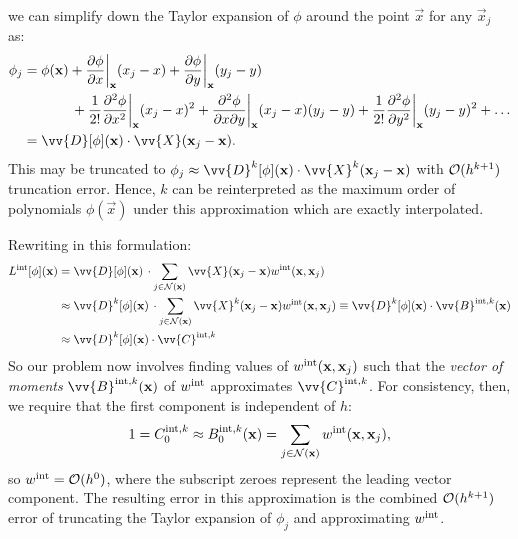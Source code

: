 we can simplify down the Taylor expansion of $\phi$ around the point $\vec{x}$ for any $\vec{x}_j$ as:
\begin{subequations}
\begin{align}
\phi_j &= \phi(\vec{x}) + \pdv{\phi}{x}\bigg|_{\vec{x}} (x_j - x) + \pdv{\phi}{y} \bigg|_{\vec{x}} (y_j - y)  \\
& \qquad  \quad \ \, + \frac{1}{2!} \pdv[2]{\phi}{x}\bigg|_{\vec{x}} (x_j - x)^2 + \pdv[2]{\phi}{x}{y}\bigg|_{\vec{x}} (x_j - x) (y_j - y) + \frac{1}{2!} \pdv[2]{\phi}{y}\bigg|_{\vec{x}} (y_j - y)^2 + \dots \\
&= \vv{D}[\phi](\vec{x}) \cdot \vv{X} (\vec{x}_j - \vec{x}).
\end{align}
\end{subequations}
This may be truncated to $\phi_j \approx \vv{D}^k[\phi](\vec{x}) \cdot \vv{X}^k (\vec{x}_j - \vec{x})$ with $\cl{O}(h^{k + 1})$ truncation error. Hence, $k$ can be reinterpreted as the maximum order of polynomials $\phi(\vec{x})$ under this approximation which are exactly interpolated.

Rewriting  in this formulation:
\begin{subequations}
\begin{align}
L^{\rm{int}}[\phi](\vec{x}) &= \vv{D}[\phi](\vec{x}) \, \cdot \sum_{j \in \cl{N}(\vec{x})} \vv{X} (\vec{x}_j - \vec{x}) w^{\rm{int}}(\vec{x}, \vec{x}_j) \\
&\approx \vv{D}^k[\phi](\vec{x}) \, \cdot \sum_{j \in \cl{N}(\vec{x})} \vv{X}^k (\vec{x}_j - \vec{x}) w^{\rm{int}}(\vec{x}, \vec{x}_j) \equiv \vv{D}^k[\phi](\vec{x}) \cdot \vv{B}^{\rm{int}, k}(\vec{x}) \\
&\approx \vv{D}^k[\phi](\vec{x}) \cdot \vv{C}^{\rm{int}, k}
\end{align}
\end{subequations}
So our problem now involves finding values of $w^{\rm{int}}(\vec{x}, \vec{x}_j)$ such that the \emph{vector of moments} $\vv{B}^{\rm{int}, k}(\vec{x})$ of $w^{\rm{int}}$ approximates $\vv{C}^{\rm{int}, k}$. For consistency, then, we require that the first component is independent of $h$:
\begin{equation}
1 = C^{\rm{int}, k}_0 \approx B^{\rm{int}, k}_0(\vec{x}) = \sum_{j \in \cl{N}(\vec{x})} w^{\rm{int}} (\vec{x}, \vec{x}_j),
\end{equation}
so $w^{\rm{int}} = \cl{O}(h^0)$, where the subscript zeroes represent the leading vector component. The resulting error in this approximation is the combined $\cl{O}(h^{k + 1})$ error of truncating the Taylor expansion of $\phi_j$ and approximating $w^{\rm{int}}$.

